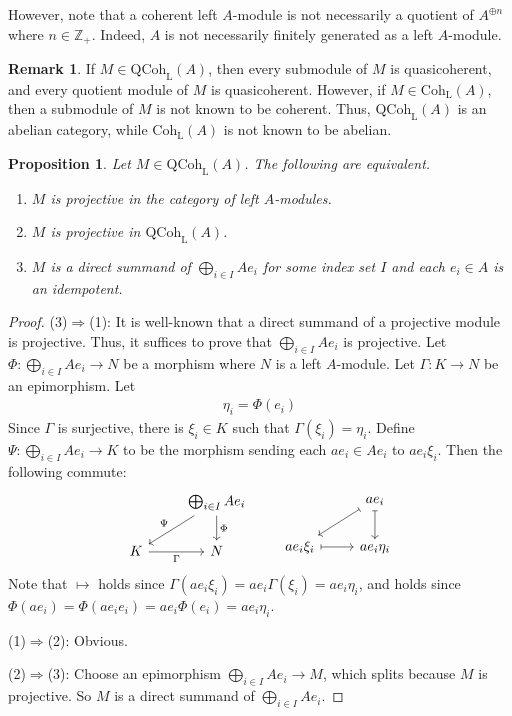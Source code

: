 \documentclass[11pt,b5paper,notitlepage]{article}
\theoremstyle{definition}
\newtheorem{rem}[df]{Remark}
\theoremstyle{plain}
\newtheorem{pp}[df]{Proposition}
\newcommand{\Zbb}{\mathbb Z}
\newcommand{\QC}{\mathrm{QCoh}_{\mathrm L}}
\newcommand{\Coh}{\mathrm{Coh}_{\mathrm L}}
\numberwithin{equation}{section}
\begin{document}
However, note that a coherent left $A$-module is not necessarily a quotient of $A^{\oplus n}$ where $n\in\Zbb_+$. Indeed, $A$ is not necessarily finitely generated as a left $A$-module.

\begin{rem}\label{lb55}
If $M\in\QC(A)$, then every submodule of $M$ is quasicoherent, and every quotient module of $M$ is quasicoherent. However, if $M\in \Coh(A)$, then a submodule of $M$ is not known to be coherent. Thus, $\QC(A)$ is an abelian category, while $\Coh(A)$ is not known to be abelian.
\end{rem}




\begin{pp}\label{lb1}
Let $M\in\QC(A)$. The following are equivalent.
\begin{enumerate}[label=(\arabic*)]
\item $M$ is projective in the category of left $A$-modules.
\item $M$ is projective in $\QC(A)$.
\item $M$ is a direct summand of $\bigoplus_{i\in I}Ae_i$ for some index set $I$ and each $e_i\in A$ is an idempotent. 
\end{enumerate}
\end{pp}


\begin{proof}
(3)$\Rightarrow$(1): It is well-known that a direct summand of a projective module is projective. Thus, it suffices to prove that $\bigoplus_{i\in I}Ae_i$ is projective.  Let $\Phi:\bigoplus_{i\in I}Ae_i\rightarrow N$ be a morphism where $N$ is a left $A$-module.  Let $\Gamma:K\rightarrow N$ be an epimorphism. Let
\begin{align*}
\eta_i=\Phi(e_i)
\end{align*}
Since $\Gamma$ is surjective, there is $\xi_i\in K$ such that $\Gamma(\xi_i)=\eta_i$. Define $\Psi:\bigoplus_{i\in I}Ae_i\rightarrow K$ to be the morphism sending each $ae_i\in Ae_i$ to $ae_i\xi_i$. Then the following commute:
\begin{equation*}
\begin{tikzcd}
            & \bigoplus_{i\in I}Ae_i \arrow[d,"\Phi"] \arrow[ld,"\Psi"'] \\
K \arrow[r,"\Gamma"'] & N                     
\end{tikzcd}
\qquad
\begin{tikzcd}
                     & ae_i \arrow[d, maps to] \arrow[ld, maps to] \\
ae_i\xi_i \arrow[r, maps to] &  ae_i\eta_i                                       
\end{tikzcd}
\end{equation*}
Note that $\mapsto$ holds since $\Gamma(ae_i\xi_i)=ae_i\Gamma(\xi_i)=ae_i\eta_i$, and  holds since $\Phi(ae_i)=\Phi(ae_ie_i)=ae_i\Phi(e_i)=ae_i\eta_i$.

(1)$\Rightarrow$(2): Obvious.

(2)$\Rightarrow$(3): Choose an epimorphism $\bigoplus_{i\in I}Ae_i\rightarrow M$, which splits because $M$ is projective. So $M$ is a direct summand of $\bigoplus_{i\in I}Ae_i$.
\end{proof}
\end{document}
